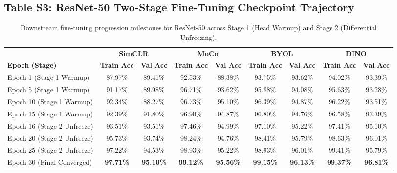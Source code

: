 \documentclass[11pt,a4paper]{article}
\begin{document}
\subsection*{Table S3: ResNet-50 Two-Stage Fine-Tuning Checkpoint Trajectory}
\begin{table}[htbp]
\centering
\caption{Downstream fine-tuning progression milestones for ResNet-50 across Stage 1 (Head Warmup) and Stage 2 (Differential Unfreezing).}
\label{tab:s3_r50_ft}
\begin{adjustbox}{max width=\textwidth}
\begin{tabular}{l c c c c c c c c}
\toprule
& \multicolumn{2}{c}{\textbf{SimCLR}} & \multicolumn{2}{c}{\textbf{MoCo}} & \multicolumn{2}{c}{\textbf{BYOL}} & \multicolumn{2}{c}{\textbf{DINO}} \\
\cmidrule(lr){2-3} \cmidrule(lr){4-5} \cmidrule(lr){6-7} \cmidrule(lr){8-9}
\textbf{Epoch (Stage)} & \textbf{Train Acc} & \textbf{Val Acc} & \textbf{Train Acc} & \textbf{Val Acc} & \textbf{Train Acc} & \textbf{Val Acc} & \textbf{Train Acc} & \textbf{Val Acc} \\
\midrule
Epoch 1 (Stage 1 Warmup)   & 87.97\% & 89.41\% & 92.53\% & 88.38\% & 93.75\% & 93.62\% & 94.02\% & 93.39\% \\
Epoch 5 (Stage 1 Warmup)   & 91.17\% & 89.98\% & 96.71\% & 93.62\% & 95.88\% & 94.08\% & 95.63\% & 93.28\% \\
Epoch 10 (Stage 1 Warmup)  & 92.34\% & 88.27\% & 96.73\% & 95.10\% & 96.39\% & 94.87\% & 96.22\% & 93.51\% \\
Epoch 15 (Stage 1 Warmup)  & 92.39\% & 91.80\% & 96.90\% & 94.87\% & 96.80\% & 94.76\% & 96.58\% & 93.39\% \\
\midrule
Epoch 16 (Stage 2 Unfreeze)& 93.51\% & 93.51\% & 97.46\% & 94.99\% & 97.10\% & 95.22\% & 97.41\% & 95.10\% \\
Epoch 20 (Stage 2 Unfreeze)& 95.73\% & 93.74\% & 98.24\% & 94.76\% & 98.41\% & 95.79\% & 98.63\% & 96.01\% \\
Epoch 25 (Stage 2 Unfreeze)& 97.22\% & 94.53\% & 98.93\% & 95.22\% & 98.93\% & 96.01\% & 99.41\% & 95.79\% \\
Epoch 30 (Final Converged) & \textbf{97.71\%} & \textbf{95.10\%} & \textbf{99.12\%} & \textbf{95.56\%} & \textbf{99.15\%} & \textbf{96.13\%} & \textbf{99.37\%} & \textbf{96.81\%} \\
\bottomrule
\end{tabular}
\end{adjustbox}
\end{table}
\end{document}

